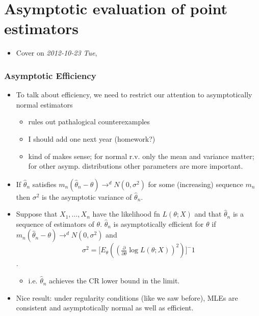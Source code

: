 
\part*{Asymptotic evaluation of point estimators}%

\begin{itemize}
\item Cover on \textit{2012-10-23 Tue},
\end{itemize}
\section{Asymptotic Efficiency}
\label{sec-1}

\begin{itemize}
\item To talk about efficiency, we need to restrict our attention to
      asymptotically normal estimators
\begin{itemize}
\item rules out pathalogical counterexamples
\item I should add one next year (homework?)
\item kind of makes sense; for normal r.v. only the mean and
        variance matter; for other asymp. distributions other
        parameters are more important.
\end{itemize}
\item If $\hat\theta_n$ satisfies $m_n (\hat\theta_n - \theta) \to^d
      N(0, \sigma^2)$ for some (increasing) sequence $m_n$ then
      $\sigma^2$ is the asymptotic variance of $\hat\theta_n$.
\item Suppose that $X_1,\dots,X_n$ have the likelihood fn $L(\theta;
      X)$ and that $\hat\theta_n$ is a sequence of estimators of
      $\theta$.  $\hat\theta_n$ is asymptotically efficient for
      $\theta$ if $m_n (\hat\theta_n - \theta) \to^d N(0, \sigma^2)$
      and 
      \[\sigma^2 = \Big[E_\theta ((\tfrac{\partial}{\partial \theta} \log L(\theta; X))^2)\big]^-1\].
\begin{itemize}
\item i.e. $\hat\theta_n$ achieves the CR lower bound in the limit.
\end{itemize}
\item Nice result: under regularity conditions (like we saw before),
      MLEs are consistent and asymptotically normal as well as
      efficient.
\end{itemize}

